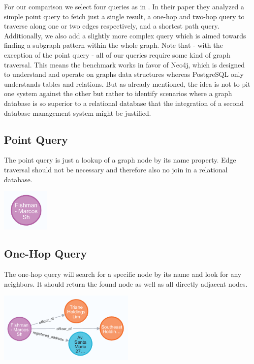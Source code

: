 \documentclass[11pt, a4paper,oneside,chapterprefix=false]{scrbook}
\begin{document}
For our comparison we select four queries as in \cite{graphdbbenchmark}.
In their paper they analyzed a simple point query to fetch just a single result, a one-hop and two-hop query to traverse along one or two edges respectively, and a shortest path query.
Additionally, we also add a slightly more complex query which is aimed towards finding a subgraph pattern within the whole graph.
Note that - with the exception of the point query - all of our queries require some kind of graph traversal.
This means the benchmark works in favor of Neo4j, which is designed to understand and operate on graphs data structures whereas PostgreSQL only understands tables and relations.
But as already mentioned, the idea is not to pit one system against the other but rather to identify scenarios where a graph database is so superior to a relational database that the integration of a second database management system might be justified.

\subsection{Point Query}

The point query is just a lookup of a graph node by its name property.
Edge traversal should not be necessary and therefore also no join in a relational database.

\begin{center}
\includegraphics*[width=0.175\textwidth]{figures/query-point.png}
\end{center}
\newpage
\subsection{One-Hop Query}

The one-hop query will search for a specific node by its name and look for any neighbors. It should return the found node as well as all directly adjacent nodes.

\begin{center}
\includegraphics*[width=0.5\textwidth]{figures/query-one-hop.png}
 \label{fig:two-hop}
\end{center}
\end{document}
